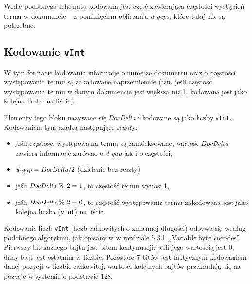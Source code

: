 Wedle podobnego schematu kodowana jest część zawierająca częstości wystąpień termu w dokumencie -- z pominięciem obliczania \emph{d-gaps}, które tutaj nie są potrzebne.

\subsection{Kodowanie \texttt{vInt}}

W tym formacie kodowania informacje o numerze dokumentu oraz o częstości występowania termu są zakodowane naprzemiennie (tzn. jeśli częstość występowania termu w danym dokumencie jest większa niż 1, kodowana jest jako kolejna liczba na liście). 

Elementy tego bloku nazywane się \emph{DocDelta} i kodowane są jako liczby \texttt{vInt}. Kodowaniem tym rządzą następujące reguły:
\begin{itemize}
 \item jeśli częstości występowania termu są zaindeksowane, wartość \emph{DocDelta} zawiera informacje zarówno o \emph{d-gap} jak i o częstości,
 \item $\emph{d-gap} = \emph{DocDelta} / 2$ (dzielenie bez reszty)
 \item jeśli $\emph{DocDelta}~\%~2 = 1$, to częstość termu wynosi 1,
 \item jeśli $\emph{DocDelta}~\%~2 = 0$, to częstość występowania termu zakodowana jest jako kolejna liczba (\texttt{vInt}) na liście.
\end{itemize}

Kodowanie liczb \texttt{vInt} (liczb całkowitych o zmiennej długości) odbywa się według podobnego algorytmu, jak opisany w \cite{irbook} w rozdziale 5.3.1 ,,Variable byte encodes''. Pierwszy bit każdego bajtu jest bitem kontynuacji: jeśli jego wartością jest 0, dany bajt jest ostatnim w liczbie. Pozostałe 7 bitów jest faktycznym kodowaniem danej pozycji w liczbie całkowitej: wartości kolejnych bajtów przekładają się na pozycje w systemie o podstawie 128.